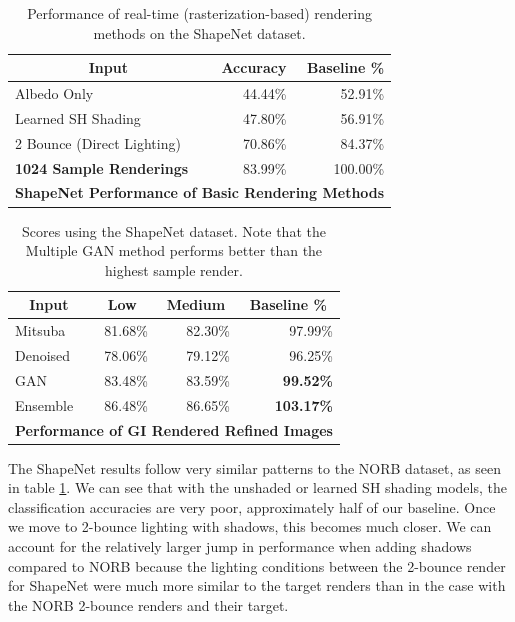 \documentclass[10pt,twocolumn,letterpaper]{article}
\begin{document}
\begin{table}[]
\centering
\begin{tabular}{|l|r|r|}
\hline
\multicolumn{1}{|c|}{\textbf{Input}}
& \multicolumn{1}{r|}{\textbf{Accuracy}}
& \multicolumn{1}{r|}{\textbf{Baseline \%}} \\ \hline
Albedo Only 				&44.44\%	& 52.91\%	\\
Learned SH Shading			&47.80\%	& 56.91\%	\\
2 Bounce (Direct Lighting)	&70.86\%	& 84.37\%   \\
\textbf{1024 Sample Renderings}		& 83.99\%	& 100.00\%	\\ \hline
\multicolumn{3}{|c|}{\textbf{ShapeNet Performance of Basic Rendering Methods}}	\\ \hline
\end{tabular}
\caption{Performance of real-time (rasterization-based) rendering methods on the ShapeNet dataset.}
\label{table:tblnonGI_sn}
\end{table}

\begin{table}[]
\centering
\begin{tabular}{|l|r|r|r|}
\hline
\multicolumn{1}{|c|}{\textbf{Input}}
& \multicolumn{1}{c|}{\textbf{Low}}
& \multicolumn{1}{c|}{\textbf{Medium}}
& \multicolumn{1}{c|}{\textbf{Baseline \%}} \\ \hline
Mitsuba		& 81.68\%	& 82.30\%	& 97.99\% \\
Denoised	& 78.06\%	& 79.12\%	& 96.25\%	\\
GAN	& 83.48\%	& 83.59\%	& \textbf{99.52\%}	\\
Ensemble& 86.48\%	& 86.65\% 	& \textbf{103.17\%}		\\ \hline
\multicolumn{4}{|c|}{\textbf{Performance of GI Rendered Refined Images}}	\\ \hline
\end{tabular}
\caption{Scores using the ShapeNet dataset. Note that the Multiple GAN method performs better than the highest sample render.
}
\label{table:tblallrefined_sn}
\end{table}

The ShapeNet results follow very similar patterns to the NORB dataset, as seen in table \ref{table:tblnonGI_sn}. We can see that with the unshaded or learned SH shading models, the classification accuracies are very poor, approximately half of our baseline. Once we move to 2-bounce lighting with shadows, this becomes much closer. We can account for the relatively larger jump in performance when adding shadows compared to NORB because the lighting conditions between the 2-bounce render for ShapeNet were much more similar to the target renders than in the case with the NORB 2-bounce renders and their target. %
\end{document}
